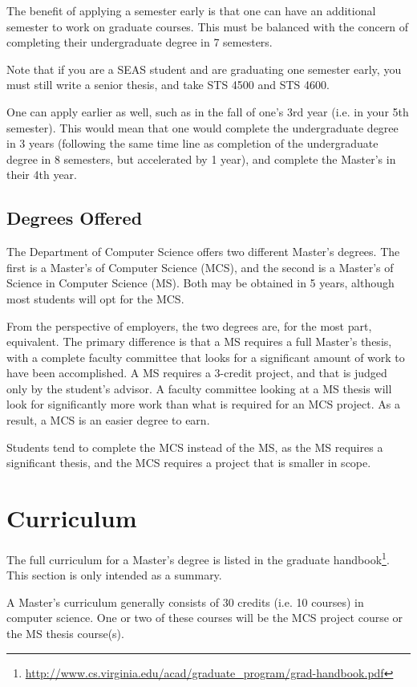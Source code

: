 \documentclass[10pt,letter]{book}
\newcommand{\mysection}[1]{\section{#1}\renewcommand{\rightmark}{#1}}
\newcommand{\myurl}[1]{\footnote{\scriptsize\url{#1}}}
\begin{document}
The benefit of applying a semester early is that one can have an
additional semester to work on graduate courses.  This must be
balanced with the concern of completing their undergraduate degree in
7 semesters.

Note that if you are a SEAS student and are graduating one semester
early, you must still write a senior thesis, and take STS 4500 and STS
4600.

One can apply earlier as well, such as in the fall of one's 3rd year
(i.e. in your 5th semester).  This would mean that one would complete
the undergraduate degree in 3 years (following the same time line as
completion of the undergraduate degree in 8 semesters, but accelerated
by 1 year), and complete the Master's in their 4th year.


\subsection{Degrees Offered}

The Department of Computer Science offers two different Master's
degrees.  The first is a Master's of Computer Science (MCS), and the
second is a Master's of Science in Computer Science (MS).  Both may be
obtained in 5 years, although most students will opt for the MCS.

From the perspective of employers, the two degrees are, for the most part,
equivalent.  The primary difference is that a MS requires a full
Master's thesis, with a complete faculty committee that looks for a
significant amount of work to have been accomplished.  A MS requires a
3-credit project, and that is judged only by the student's advisor.  A
faculty committee looking at a MS thesis will look for significantly
more work than what is required for an MCS project.  As a result, a
MCS is an easier degree to earn.

Students tend to complete the MCS instead of the MS, as the MS
requires a significant thesis, and the MCS requires a project that is
smaller in scope.


\mysection{Curriculum}

The full curriculum for a Master's degree is listed in the graduate
handbook\myurl{http://www.cs.virginia.edu/acad/graduate_program/grad-handbook.pdf}.
This section is only intended as a summary.

A Master's curriculum generally consists of 30 credits (i.e. 10
courses) in computer science.  One or two of these courses will be the
MCS project course or the MS thesis course(s).
\end{document}
